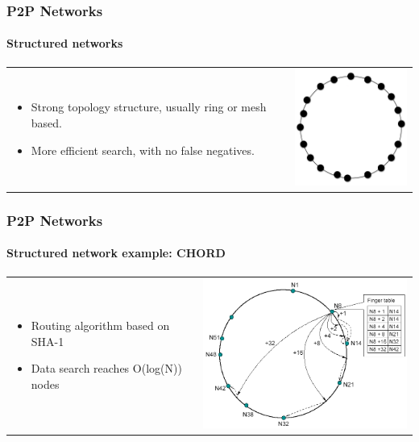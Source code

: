 \documentclass[12pt]{beamer}
\begin{document}
  \begin{frame}
  \frametitle{P2P Networks}
  \framesubtitle{Structured networks}
  \begin{table}
  \begin{tabular}{p{7cm}p{3cm}}
  \begin{itemize}
      \item Strong topology structure, usually ring or mesh based.
      \item More efficient search, with no false negatives.
  \end{itemize}
  &
  \vspace{1.5cm}
  \includegraphics[width=4cm]{../../presentacion/img/p2p-structured}\\
  \end{tabular}
  \end{table}
  \end{frame}

  \begin{frame}
  \frametitle{P2P Networks}
  \framesubtitle{Structured network example: CHORD}
  \begin{table}
  \begin{tabular}{p{3cm}p{7cm}}
  \begin{itemize}
      \item Routing algorithm based on SHA-1
      \item Data search reaches O(log(N)) nodes
  \end{itemize}
  &
  \vspace{0.5cm}
  \includegraphics[width=8cm]{../../presentacion/img/chord-search}\\
  \end{tabular}
  \end{table}
  \end{frame}
  
\end{document}
